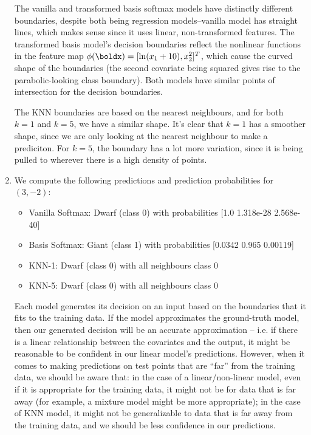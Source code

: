\documentclass[submit]{harvardml}
\begin{document}
\begin{enumerate}
The vanilla and transformed basis softmax models have distinctly different boundaries, despite both being regression models–vanilla model has straight lines, which makes sense since it uses linear, non-transformed features. The transformed basis model's decision boundaries reflect the nonlinear functions in the feature map $\phi(\boldx) = [\ln(x_1 + 10), x_2^2]^T$, which cause the curved shape of the boundaries (the second covariate being squared gives rise to the parabolic-looking class boundary). Both models have similar points of intersection for the decision boundaries. 

The KNN boundaries are based on the nearest neighbours, and for both $k=1$ and $k=5$, we have a similar shape. It's clear that $k=1$ has a smoother shape, since we are only looking at the nearest neighbour to make a prediciton. For $k=5$, the boundary has a lot more variation, since it is being pulled to wherever there is a high density of points.

\item 
We compute the following predictions and prediction probabilities for $(3, -2)$:

\begin{itemize}
    \item Vanilla Softmax: Dwarf (class 0) with probabilities [1.0 1.318e-28 2.568e-40]
    \item Basis Softmax: Giant (class 1) with probabilities [0.0342 0.965 0.00119]
    \item KNN-1: Dwarf (class 0) with all neighbours class 0
    \item KNN-5: Dwarf (class 0) with all neighbours class 0
\end{itemize}

Each model generates its decision on an input based on the boundaries that it fits to the training data. If the model approximates the ground-truth model, then our generated decision will be an accurate approximation -- i.e. if there is a linear relationship between the covariates and the output, it might be reasonable to be confident in our linear model's predictions. However, when it comes to making predictions on test points that are ``far'' from the training data, we should be aware that: in the case of a linear/non-linear model, even if it is appropriate for the training data, it might not be for data that is far away (for example, a mixture model might be more appropriate); in the case of KNN model, it might not be generalizable to data that is far away from the training data, and we should be less confidence in our predictions.

\end{enumerate}
\end{document}
